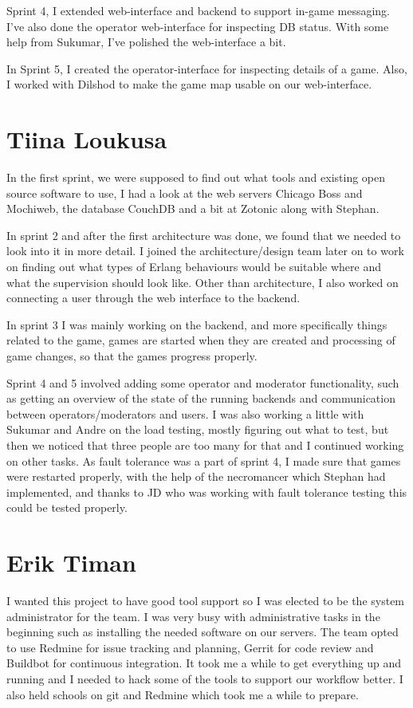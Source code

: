 \documentclass[11pt,a4paper]{report}
\begin{document}
Sprint 4, I extended web-interface and backend to support in-game messaging.
I've also done the operator web-interface for inspecting DB status.
With some help from Sukumar, I've polished the web-interface a bit.

In Sprint 5, I created the operator-interface for inspecting details of a game.
Also, I worked with Dilshod to make the game map usable on our web-interface.
\section{Tiina Loukusa}
In the first sprint, we were supposed to find out what tools and existing
open source software to use, I had a look at the web servers Chicago Boss and
Mochiweb, the database CouchDB and a bit at Zotonic along with Stephan.

In sprint 2 and after the first architecture was done, we found that we
needed to look into it in more detail. I joined the architecture/design team
later on to work on finding out what types of Erlang behaviours would be
suitable where and what the supervision should look like. Other than
architecture, I also worked on connecting a user through the web interface to
the backend.

In sprint 3 I was mainly working on the backend, and more specifically things
related to the game, games are started when they are created and processing of
game changes, so that the games progress properly.

Sprint 4 and 5 involved adding some operator and moderator functionality, such
as getting an overview of the state of the running backends and communication
between operators/moderators and users. I was also working a little with Sukumar
and Andre on the load testing, mostly figuring out what to test, but then we
noticed that three people are too many for that and I continued working on other
tasks.
As fault tolerance was a part of sprint 4, I made sure that games were restarted
properly, with the help of the necromancer which Stephan had implemented, and
thanks to JD who was working with fault tolerance testing this could be tested
properly.
\section{Erik Timan}
I wanted this project to have good tool support so I was elected to be the
system administrator for the team. I was very busy with administrative tasks in
the beginning such as installing the needed software on our servers. The team
opted to use Redmine for issue tracking and planning, Gerrit for code review and
Buildbot for continuous integration. It took me a while to get everything up and
running and I needed to hack some of the tools to support our workflow better. I
also held schools on git and Redmine which took me a while to prepare.
\end{document}
